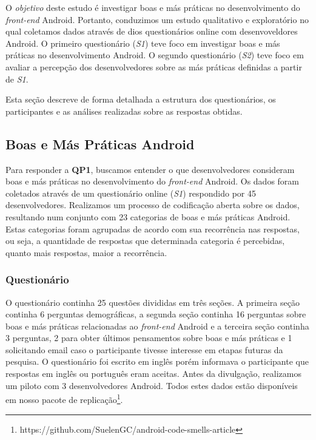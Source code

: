 O \emph{objetivo} deste estudo é investigar boas e más práticas no desenvolvimento do \textit{front-end} Android. Portanto, conduzimos um estudo qualitativo e exploratório no qual coletamos dados através de dios questionários online com desenvoveldores Android. O primeiro questionário (\textit{S1}) teve foco em investigar boas e más práticas no desenvolvimento Android. O segundo questionário (\textit{S2}) teve foco em avaliar a percepção dos desenvolvedores sobre as más práticas definidas a partir de \textit{S1}. 


Esta seção descreve de forma detalhada a estrutura dos questionários, os participantes e as análises realizadas sobre as respostas obtidas.

\subsection{Boas e Más Práticas Android}

Para responder a \textbf{QP1}, buscamos entender o que desenvolvedores consideram boas e más práticas no desenvolvimento do \textit{front-end} Android. Os dados foram coletados através de um questionário online (\textit{S1}) respondido por 45 desenvolvedores. Realizamos um processo de codificação aberta sobre os dados, resultando num conjunto com 23 categorias de boas e más práticas Android. Estas categorias foram agrupadas de acordo com sua recorrência nas respostas, ou seja, a quantidade de respostas que determinada categoria é percebidas, quanto mais respostas, maior a recorrência.

\subsubsection{Questionário}
\label{sub:questionario}

O questionário continha 25 questões divididas em três seções. A primeira seção continha 6 perguntas demográficas, a segunda seção continha 16 perguntas sobre boas e más práticas relacionadas ao \textit{front-end} Android e a terceira seção continha 3 perguntas, 2 para obter últimos pensamentos sobre boas e más práticas e 1 solicitando email caso o participante tivesse interesse em etapas futuras da pesquisa. O questionário foi escrito em inglês porém informava o participante que respostas em inglês ou português eram aceitas. Antes da divulgação, realizamos um piloto com 3 desenvolvedores Android. Todos estes dados estão disponíveis em nosso pacote de replicação\footnote{https://github.com/SuelenGC/android-code-smells-article}.

